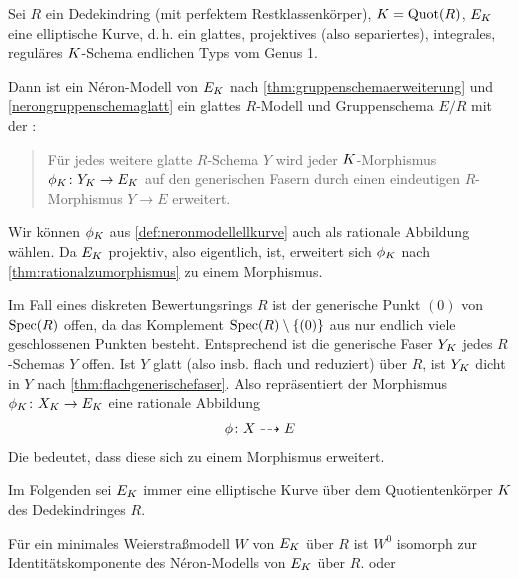 \documentclass[german]{scrreprt}
\begin{document}
\begin{Bemerkung}
  \label{def:neronmodellellkurve}
  Sei $R$ ein Dedekindring (mit perfektem Restklassenkörper),
  $K=\operatorname{Quot}(R)$, $E_{K}$ eine elliptische Kurve, d.\,h. ein
  glattes, projektives (also separiertes), integrales, reguläres
  $K$-Schema endlichen Typs vom Genus 1.
  
  Dann ist ein Néron-Modell von $E_{K}$ nach
  \ref{thm:gruppenschemaerweiterung} und \ref{nerongruppenschemaglatt}
  ein glattes $R$-Modell und Gruppenschema $E/R$ mit der
  \NAbbEig:
  \begin{quote}
    Für jedes weitere glatte $R$-Schema $Y$ wird jeder
    $K$-Morphismus $\phi_{K}\colon Y_{K}\to E_{K}$ auf den generischen
    Fasern durch einen eindeutigen $R$-Morphismus $Y\to E$ erweitert.
  \end{quote}
  \cite[Chapter IV.5]{silverman2}
\end{Bemerkung}
\begin{Bemerkung}\label{thm:dichtefaser}
  Wir können $\phi_{K}$ aus \autoref{def:neronmodellellkurve} auch als
  rationale Abbildung wählen. Da $E_{K}$ projektiv, also eigentlich,
  ist, erweitert sich $\phi_{K}$ nach
  \autoref{thm:rationalzumorphismus} zu einem Morphismus.

  Im Fall eines diskreten Bewertungsrings $R$ ist der generische Punkt
  $(0)$ von $\operatorname{Spec}(R)$ offen, da das Komplement
  $\operatorname{Spec}(R)\setminus\{(0)\}$ aus nur endlich viele geschlossenen
  Punkten besteht. Entsprechend ist die generische Faser $Y_{K}$ jedes
  $R$-Schemas $Y$ offen.
  Ist $Y$ glatt (also insb. flach und reduziert) über $R$, ist $Y_{K}$
  dicht in $Y$ nach \autoref{thm:flachgenerischefaser}.
  Also repräsentiert der Morphismus $\phi_{K}\colon X_{K}\to E_{K}$ eine
  rationale Abbildung
  \begin{gather*}
    \phi\colon X\dashrightarrow E
  \end{gather*}
  Die \NAbbEig bedeutet, dass diese sich zu einem Morphismus erweitert.
\end{Bemerkung}

Im Folgenden sei $E_{K}$ immer eine elliptische Kurve über dem
Quotientenkörper $K$ des Dedekindringes $R$.

\begin{Bemerkung}
  Für ein minimales Weierstraßmodell $W$ von $E_{K}$ über $R$
  ist $W^0$ isomorph zur Identitätskomponente des Néron-Modells von
  $E_{K}$ über $R$.
  \cite[Corollary IV.9.1]{silverman2} oder
  \cite[Chapter 1.5, S.\,23]{neron}
\end{Bemerkung}
\end{document}
